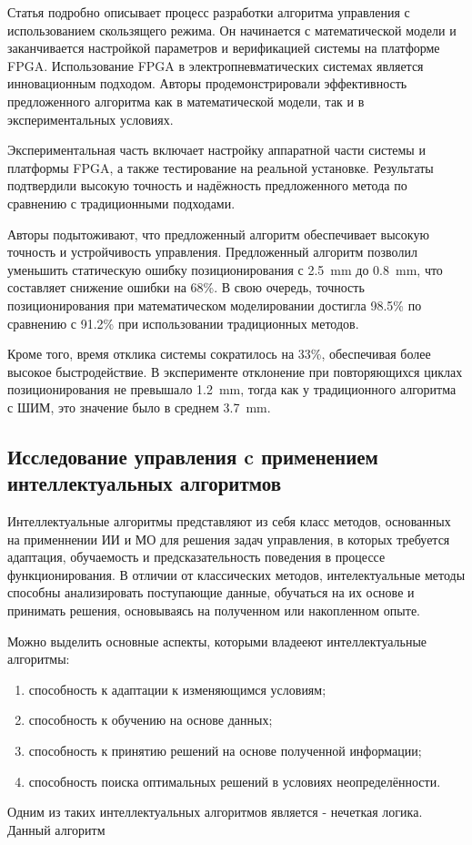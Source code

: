 Статья подробно описывает процесс разработки алгоритма управления с использованием скользящего режима.
Он начинается с математической модели и заканчивается настройкой параметров и верификацией системы на платформе FPGA.
Использование FPGA в электропневматических системах является инновационным подходом. Авторы продемонстрировали эффективность
предложенного алгоритма как в математической модели, так и в экспериментальных условиях.

Экспериментальная часть включает настройку аппаратной части системы и платформы FPGA, а также тестирование на реальной установке.
Результаты подтвердили высокую точность и надёжность предложенного метода по сравнению с традиционными подходами.

Авторы подытоживают, что предложенный алгоритм обеспечивает высокую точность и устройчивость управления.
Предложенный алгоритм позволил уменьшить статическую ошибку позиционирования с \num{2.5}~\si{\milli\metre} до \num{0.8}~\si{\milli\metre},
что составляет снижение ошибки на \num{68}\%.
В свою очередь, точность позиционирования при математическом моделировании достигла \num{98.5}\% по сравнению с \num{91.2}\% при
использовании традиционных методов.

Кроме того, время отклика системы сократилось на 33\%, обеспечивая более высокое быстродействие. В
эксперименте отклонение при повторяющихся циклах позиционирования не превышало \num{1.2}~\si{\milli\metre}, тогда как
у традиционного алгоритма с ШИМ, это значение было в среднем \num{3.7}~\si{\milli\metre}.

\subsection{Исследование управления c применением интеллектуальных алгоритмов}\label{subsec:ch1/sec5/subsec3}

Интеллектуальные алгоритмы представляют из себя класс методов, основанных на применнении ИИ и МО для решения задач управления, в
которых требуется адаптация, обучаемость и предсказательность поведения в процессе функционирования. В отличии от классических методов,
интелектуальные методы способны анализировать поступающие данные, обучаться на их основе и принимать решения, основываясь на полученном или
накопленном опыте.

Можно выделить основные аспекты, которыми владееют интеллектуальные алгоритмы:
\begin{enumerate}
    \item способность к адаптации к изменяющимся условиям;
    \item способность к обучению на основе данных;
    \item способность к принятию решений на основе полученной информации;
    \item способность поиска оптимальных решений в условиях неопределённости.
\end{enumerate}

Одним из таких интеллектуальных алгоритмов является - нечеткая логика. Данный алгоритм
